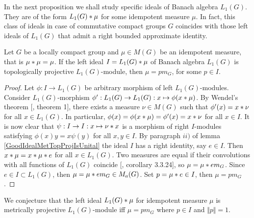 In the next proposition we shall study specific ideals of Banach algebra $L_1(G)$. They are of the form $L_1(G)\ast\mu$ for some idempotent measure $\mu$. In fact, this class of ideals in case of commutative compact groups $G$ coincides with those left ideals of $L_1(G)$ that admit a right bounded approximate identity.

\begin{proposition}\label{CommIdealByIdemMeasL1MetTopProjCharac} Let $G$ be a locally compact group and  $\mu\in M(G)$ be an idempotent measure, that is $\mu\ast\mu=\mu$. If the left ideal $I=L_1(G)\ast\mu$ of Banach algebra $L_1(G)$ is topologically projective $L_1(G)$-module, then $\mu=p m_G$, for some $p\in I$.
\end{proposition}
\begin{proof} Let $\phi:I\to L_1(G)$ be arbitrary morphism of left $L_1(G)$-modules. Consider $L_1(G)$-morphism $\phi':L_1(G)\to L_1(G):x\mapsto\phi(x\ast\mu)$. By Wendel's theorem [\cite{WendLeftCentrzrs}, theorem 1], there exists a measure $\nu\in M(G)$ such that $\phi'(x)=x\ast\nu$ for all $x\in L_1(G)$. In particular, $\phi(x)=\phi(x\ast\mu)=\phi'(x)=x\ast\nu$ for all $x\in I$. It is now clear that $\psi:I\to I:x\mapsto\nu\ast x$ is a morphism of right $I$-modules satisfying $\phi(x)y=x\psi(y)$ for all $x,y\in I$. By paragraph $ii)$ of lemma \ref{GoodIdealMetTopProjIsUnital} the ideal $I$ has a right identity, say $e\in I$. Then $x\ast\mu=x\ast\mu\ast e$ for all $x\in L_1(G)$. Two measures are equal if their convolutions with all functions of $L_1(G)$ coincide [\cite{DalBanAlgAutCont}, corollary 3.3.24], so $\mu=\mu\ast e m_G$. Since $e\in I\subset L_1(G)$, then $\mu=\mu\ast e m_G\in M_a(G)$. Set $p=\mu\ast e\in I$, then $\mu=p m_G$.
\end{proof}

We conjecture that the left ideal $L_1(G)\ast \mu$ for idempotent measure $\mu$ is metrically projective $L_1(G)$-module iff $\mu=p m_G$ where $p\in I$ and $\Vert p\Vert=1$.

